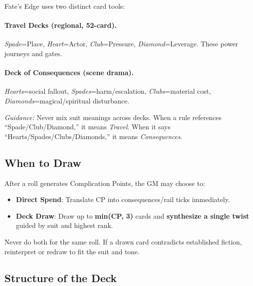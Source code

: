 Fate's Edge uses two distinct card tools:

\paragraph{Travel Decks (regional, 52-card).}
\emph{Spade}=Place, \emph{Heart}=Actor, \emph{Club}=Pressure, \emph{Diamond}=Leverage. These power journeys and gates.

\paragraph{Deck of Consequences (scene drama).}
\emph{Hearts}=social fallout, \emph{Spades}=harm/escalation, \emph{Clubs}=material cost, \emph{Diamonds}=magical/spiritual disturbance.

\textit{Guidance:} Never mix suit meanings across decks. When a rule references ``Spade/Club/Diamond,'' it means \emph{Travel}. When it says ``Hearts/Spades/Clubs/Diamonds,'' it means \emph{Consequences}.

\subsection*{When to Draw}

After a roll generates Complication Points, the GM may choose to:

\begin{itemize}
    \item \textbf{Direct Spend}: Translate CP into consequences/rail ticks immediately.
    \item \textbf{Deck Draw}: Draw up to \textbf{min(CP, 3)} cards and \textbf{synthesize a single twist} guided by suit and highest rank.
\end{itemize}

Never do both for the same roll. If a drawn card contradicts established fiction, reinterpret or redraw to fit the suit and tone.

\subsection*{Structure of the Deck}

